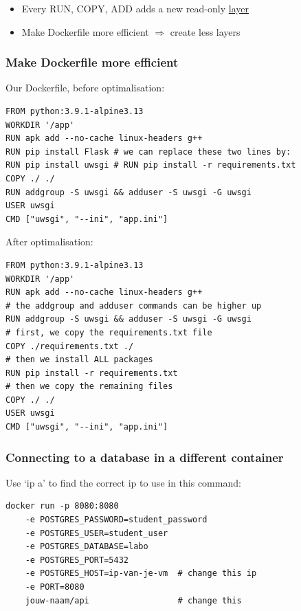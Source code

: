 \documentclass{article}
\begin{document}
\begin{itemize}
    \item Every RUN, COPY, ADD adds a new read-only \underline{layer}
    \item Make Dockerfile more efficient $\Rightarrow$ create less layers
\end{itemize}

\subsubsection{Make Dockerfile more efficient}

Our Dockerfile, before optimalisation:

\begin{verbatim}
FROM python:3.9.1-alpine3.13
WORKDIR '/app'
RUN apk add --no-cache linux-headers g++
RUN pip install Flask # we can replace these two lines by:
RUN pip install uwsgi # RUN pip install -r requirements.txt
COPY ./ ./
RUN addgroup -S uwsgi && adduser -S uwsgi -G uwsgi
USER uwsgi
CMD ["uwsgi", "--ini", "app.ini"]
\end{verbatim}

After optimalisation:

\begin{verbatim}
FROM python:3.9.1-alpine3.13
WORKDIR '/app'
RUN apk add --no-cache linux-headers g++
# the addgroup and adduser commands can be higher up
RUN addgroup -S uwsgi && adduser -S uwsgi -G uwsgi
# first, we copy the requirements.txt file
COPY ./requirements.txt ./
# then we install ALL packages
RUN pip install -r requirements.txt
# then we copy the remaining files
COPY ./ ./
USER uwsgi
CMD ["uwsgi", "--ini", "app.ini"]
\end{verbatim}

\subsubsection{Connecting to a database in a different container}

Use `ip a' to find the correct ip to use in this command:

\begin{verbatim}
docker run -p 8080:8080 
    -e POSTGRES_PASSWORD=student_password 
    -e POSTGRES_USER=student_user 
    -e POSTGRES_DATABASE=labo 
    -e POSTGRES_PORT=5432 
    -e POSTGRES_HOST=ip-van-je-vm  # change this ip
    -e PORT=8080 
    jouw-naam/api                  # change this
\end{verbatim}
\end{document}
